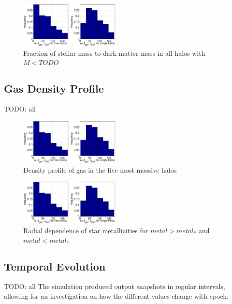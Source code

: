 \documentclass[useAMS,usenatbib]{mn2e}
\begin{document}
\begin{figure}
  \begin{center}
    \includegraphics[width=0.45\textwidth]{fig/a.eps}%
  \end{center}
  \caption{\label{fig:hist_mstarbymdm}Fraction of stellar mass to dark matter mass in all halos with $M<TODO$}
\end{figure}


\subsection{Gas Density Profile}
TODO: all

\begin{figure}
  \begin{center}
    \includegraphics[width=0.45\textwidth]{fig/a.eps}%
  \end{center}
  \caption{\label{fig:gas_prof}Density profile of gas in the five most massive halos}
\end{figure}

\begin{figure}
  \begin{center}
    \includegraphics[width=0.45\textwidth]{fig/a.eps}%
  \end{center}
  \caption{\label{fig:metal_2}Radial dependence of star metallicities for $metal>metal_*$ and $metal<metal_*$}
\end{figure}


\subsection{Temporal Evolution}
TODO: all
The simulation produced output snapshots in regular intervals, allowing for an investigation on how the different values change with epoch.
\end{document}
